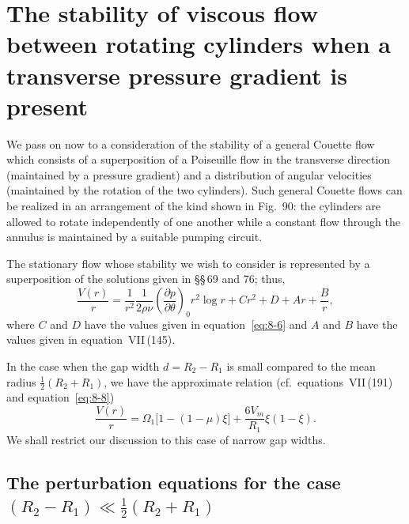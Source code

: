 \section{The stability of viscous flow between rotating cylinders when a transverse pressure gradient is present}
\label{sec:77}

We pass on now to a consideration of the stability of a general Couette flow which consists of a superposition of a Poiseuille flow in the transverse direction (maintained by a pressure gradient) and a distribution of angular velocities (maintained by the rotation of the two cylinders). Such general Couette flows can be realized in an arrangement of the kind shown in Fig.~90: the cylinders are allowed to rotate independently of one another while a constant flow through the annulus is maintained by a suitable pumping circuit.


The stationary flow whose stability we wish to consider is represented by a superposition of the solutions given in \S\S\,69 and 76; thus,
\begin{equation}
\label{eq:8-36}
\frac{V(r)}{r} = \frac{1}{r^2}\frac{1}{2\rho\nu}\!\left(\frac{\partial p}{\partial\theta}\right)_{\!0} r^2\log r + Cr^2 + D + Ar + \frac{B}{r},
\end{equation}
where $C$ and $D$ have the values given in equation~\eqref{eq:8-6} and $A$ and $B$ have the values given in equation~VII\,(145).

In the case when the gap width $d = R_2 - R_1$ is small compared to the mean radius $\tfrac{1}{2}(R_2+R_1)$, we have the approximate relation (cf.\ equations~VII\,(191) and equation~\eqref{eq:8-8})
\begin{equation}
\label{eq:8-37}
\frac{V(r)}{r} = \Omega_1\bigl[1-(1-\mu)\xi\bigr] + \frac{6V_m}{R_1}\xi(1-\xi).
\end{equation}
We shall restrict our discussion to this case of narrow gap widths.

\subsection{The perturbation equations for the case $(R_2-R_1) \ll \frac{1}{2}(R_2+R_1)$}
\label{sec:77a}

